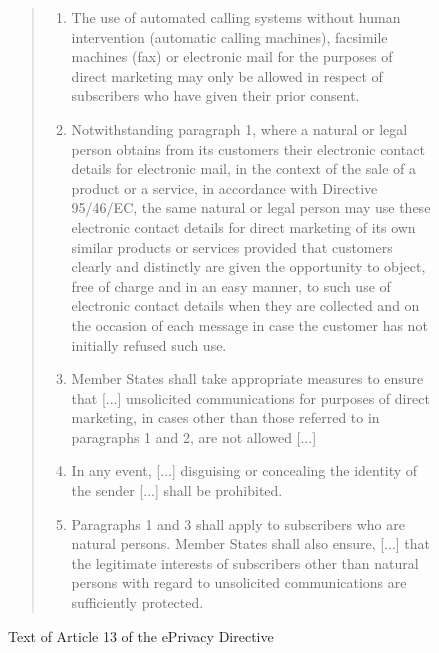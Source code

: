 \begin{figure}
\begin{minipage}{\columnwidth}
\begin{quote}
        \begin{enumerate}[1.]
            \item
            The use of automated calling systems without human
            intervention (automatic calling machines), facsimile machines
            (fax) or electronic mail for the purposes of direct marketing
            may only be allowed in respect of subscribers who have given
            their prior consent.
            \item
            Notwithstanding paragraph 1, where a natural or legal
            person obtains from its customers their electronic contact
            details for electronic mail, in the context of the sale of a
            product or a service, in accordance with Directive 95/46/EC,
            the same natural or legal person may use these electronic
            contact details for direct marketing of its own similar products
            or services provided that customers clearly and distinctly are
            given the opportunity to object, free of charge and in an easy
            manner, to such use of electronic contact details when they are
            collected and on the occasion of each message in case the
            customer has not initially refused such use.
            \item
            Member States shall take appropriate measures to ensure
            that [...] unsolicited communications for purposes
            of direct marketing, in cases other than those referred to in
            paragraphs 1 and 2, are not allowed [...]
            \item
            In any event, [...] disguising or concealing the
            identity of the sender [...] shall be prohibited. 
            \item
            Paragraphs 1 and 3 shall apply to subscribers who are
            natural persons. Member States shall also ensure,
            [...] that the legitimate interests of subscribers
            other than natural persons with regard to
            unsolicited communications are sufficiently protected.
        \end{enumerate}
    \end{quote}
    \end{minipage}
    \caption{Text of Article 13 of the ePrivacy Directive~\cite{EPD2002}
    \label{fig:eprivacy-directive-article-13}}
    \vspace{-1em}
\end{figure}

